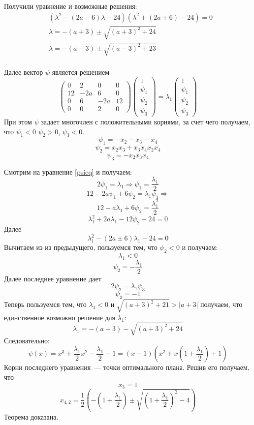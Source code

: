 Получили уравнение и возможные решения:
\begin{equation}
\begin{split}
&(\lambda^2 - (2a-6)\lambda - 24)(\lambda^2 + (2a+6) - 24) = 0\\
&\lambda  = -(a+3) ± \sqrt{(a+3)^2 + 24}\\
&\lambda = -(a-3) ± \sqrt{(a-3)^2 + 23}\\
\end{split}
\end{equation} 

Далее вектор $\psi$ является решением
\begin{equation}
\label{psieq}
\begin{pmatrix} 0 & 2 & 0 & 0 \\ 12 & -2a & 6 & 0 \\ 0 & 6 & -2a & 12 \\ 0 & 0 & 2 & 0 \end{pmatrix}\begin{pmatrix} 1 \\ \psi_1 \\ \psi_2 \\ \psi_3 \end{pmatrix} = \lambda_1 \begin{pmatrix} 1 \\ \psi_1 \\ \psi_2 \\ \psi_3 \end{pmatrix} 
\end{equation}
При этом $\psi$ задает многочлен с положительными корнями, за счет чего получаем, что $\psi_1 < 0$ $\psi_2 > 0$, $\psi_3 < 0$. 
$$ \psi_1 = -x_2 - x_3 - x_4$$
$$ \psi_2 = x_2 x_3 + x_3 x_4 x_2x_4$$
$$\psi_3 = -x_2x_3x_4$$

Смотрим на уравнение \eqref{psieq} и получаем:
$$ 2 \psi_1 = \lambda_1 \Rightarrow \psi_1 = \frac{\lambda_1}{2}$$
$$12 - 2a\psi_1 + 6\psi_2 = \lambda_1 \psi_1 \Rightarrow$$
$$12 - a\lambda_1+6\psi_2 = \frac{\lambda_1^2}{2}$$
$$\lambda_1^2 + 2a\lambda_1 - 12\psi_2 - 24 = 0$$
Далее 
$$\lambda_1^2 - (2a±6)\lambda_1 - 24 = 0$$
Вычитаем из из предыдущего, пользуемся тем, что $\psi_2 < 0$ и получаем:
$$\lambda_1 < 0$$
$$ \psi_2 = -\frac{\lambda_1}{2}$$
Далее последнее уравнение дает 
$$2\psi_2 = \lambda_1 \psi_3$$
$$\psi_3 = -1$$
Теперь пользуемся тем, что $\lambda_1 <0$ и $\sqrt{(a+3)^2 +21} > |a+3|$ получаем, что единственное возможно решение для $\lambda_1$:
$$\lambda_1 = -(a+3)-\sqrt{(a+3)^2+24}$$
Следовательно:
$$\psi(x) = x^3 + \frac{\lambda_1}{2}x^2 - \frac{\lambda_1}{2}-1 = \left(x-1\right)\left(x^2 + x(1+\frac{\lambda_1}{2}) + 1\right)$$
Корни последнего уравнения — точки оптимального плана. Решив его получаем, что 
$$x_3 = 1$$
$$x_{4,2} = \frac{1}{2}\left(-\left(1+\frac{\lambda_1}{2}\right) ± \sqrt{\left(1+\frac{\lambda_1}{2}\right)^2-4}\right)$$ 
Теорема доказана.

